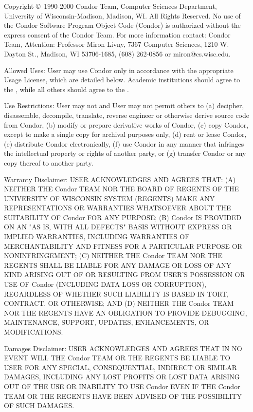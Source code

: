 Copyright \copyright\ 1990-2000 Condor Team, Computer Sciences
Department, University of Wisconsin-Madison, Madison, WI. All Rights
Reserved. No use of the Condor Software Program Object Code (Condor)
is authorized without the express consent of the Condor Team. For more
information contact: Condor Team, Attention: Professor Miron Livny,
7367 Computer Sciences, 1210 W. Dayton St., Madison, WI 53706-1685,
(608) 262-0856 or miron@cs.wisc.edu. 

Allowed Uses: User may use Condor only in accordance with the
appropriate Usage License, which are detailed below.  Academic
institutions should agree to the , while all others should agree to the .

Use Restrictions: User may not and User may not permit others to (a)
decipher, disassemble, decompile, translate, reverse engineer or
otherwise derive source code from Condor, (b) modify or prepare
derivative works of Condor, (c) copy Condor, except to make a single
copy for archival purposes only, (d) rent or lease Condor, (e)
distribute Condor electronically, (f) use Condor in any manner that
infringes the intellectual property or rights of another party, or (g)
transfer Condor or any copy thereof to another party. 

Warranty Disclaimer: USER ACKNOWLEDGES AND AGREES THAT: (A) NEITHER
THE Condor TEAM NOR THE BOARD OF REGENTS OF THE UNIVERSITY OF
WISCONSIN SYSTEM (REGENTS) MAKE ANY REPRESENTATIONS OR WARRANTIES
WHATSOEVER ABOUT THE SUITABILITY OF Condor FOR ANY PURPOSE; (B) Condor
IS PROVIDED ON AN "AS IS, WITH ALL DEFECTS" BASIS WITHOUT EXPRESS OR
IMPLIED WARRANTIES, INCLUDING WARRANTIES OF MERCHANTABILITY AND
FITNESS FOR A PARTICULAR PURPOSE OR NONINFRINGEMENT; (C) NEITHER THE
Condor TEAM NOR THE REGENTS SHALL BE LIABLE FOR ANY DAMAGE OR LOSS OF
ANY KIND ARISING OUT OF OR RESULTING FROM USER'S POSSESSION OR USE
OF Condor (INCLUDING DATA LOSS OR CORRUPTION), REGARDLESS OF WHETHER
SUCH LIABILITY IS BASED IN TORT, CONTRACT, OR OTHERWISE; AND (D)
NEITHER THE Condor TEAM NOR THE REGENTS HAVE AN OBLIGATION TO PROVIDE
DEBUGGING, MAINTENANCE, SUPPORT, UPDATES, ENHANCEMENTS, OR
MODIFICATIONS. 

Damages Disclaimer: USER ACKNOWLEDGES AND AGREES THAT IN NO EVENT WILL
THE Condor TEAM OR THE REGENTS BE LIABLE TO USER FOR ANY SPECIAL,
CONSEQUENTIAL, INDIRECT OR SIMILAR DAMAGES, INCLUDING ANY LOST PROFITS
OR LOST DATA ARISING OUT OF THE USE OR INABILITY TO USE Condor EVEN IF
THE Condor TEAM OR THE REGENTS HAVE BEEN ADVISED OF THE POSSIBILITY OF
SUCH DAMAGES. 

